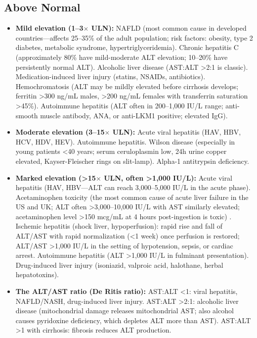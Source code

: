 \subsection*{Above Normal}
\begin{itemize}
  \item \textbf{Mild elevation (1--3$\times$ ULN):} NAFLD (most common cause in developed countries---affects 25--35\% of the adult population; risk factors: obesity, type 2 diabetes, metabolic syndrome, hypertriglyceridemia). Chronic hepatitis C (approximately 80\% have mild-moderate ALT elevation; 10--20\% have persistently normal ALT). Alcoholic liver disease (AST:ALT >2:1 is classic). Medication-induced liver injury (statins, NSAIDs, antibiotics). Hemochromatosis (ALT may be mildly elevated before cirrhosis develops; ferritin >300 ng/mL males, >200 ng/mL females with transferrin saturation >45\%). Autoimmune hepatitis (ALT often in 200--1,000 IU/L range; anti-smooth muscle antibody, ANA, or anti-LKM1 positive; elevated IgG).
  \item \textbf{Moderate elevation (3--15$\times$ ULN):} Acute viral hepatitis (HAV, HBV, HCV, HDV, HEV). Autoimmune hepatitis. Wilson disease (especially in young patients <40 years; serum ceruloplasmin low, 24h urine copper elevated, Kayser-Fleischer rings on slit-lamp). Alpha-1 antitrypsin deficiency.
  \item \textbf{Marked elevation (>15$\times$ ULN, often >1,000 IU/L):} Acute viral hepatitis (HAV, HBV---ALT can reach 3,000--5,000 IU/L in the acute phase). Acetaminophen toxicity (the most common cause of acute liver failure in the US and UK; ALT often >3,000--10,000 IU/L with AST similarly elevated; acetaminophen level >150 mcg/mL at 4 hours post-ingestion is toxic) \cite{lee2003drug}. Ischemic hepatitis (shock liver, hypoperfusion): rapid rise and fall of ALT/AST with rapid normalization (<1 week) once perfusion is restored; ALT/AST >1,000 IU/L in the setting of hypotension, sepsis, or cardiac arrest. Autoimmune hepatitis (ALT >1,000 IU/L in fulminant presentation). Drug-induced liver injury (isoniazid, valproic acid, halothane, herbal hepatotoxins).
  \item \textbf{The ALT/AST ratio (De Ritis ratio):} AST:ALT <1: viral hepatitis, NAFLD/NASH, drug-induced liver injury. AST:ALT >2:1: alcoholic liver disease (mitochondrial damage releases mitochondrial AST; also alcohol causes pyridoxine deficiency, which depletes ALT more than AST). AST:ALT >1 with cirrhosis: fibrosis reduces ALT production.
\end{itemize}

